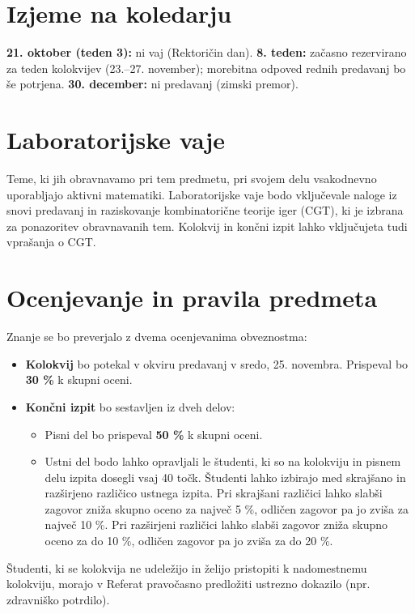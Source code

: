 \documentclass[11pt, a4paper]{article}
\begin{document}
\section*{Izjeme na koledarju}

\textbf{21. oktober (teden 3):} ni vaj (Rektoričin dan). \textbf{8. teden:} začasno rezervirano za teden kolokvijev (23.–27. november); morebitna odpoved rednih predavanj bo še potrjena. \textbf{30. december:} ni predavanj (zimski premor). 

\section*{Laboratorijske vaje}

Teme, ki jih obravnavamo pri tem predmetu, pri svojem delu vsakodnevno uporabljajo aktivni matematiki. Laboratorijske vaje bodo vključevale naloge iz snovi predavanj in raziskovanje kombinatorične teorije iger (CGT), ki je izbrana za ponazoritev obravnavanih tem. Kolokvij in končni izpit lahko vključujeta tudi vprašanja o CGT.

\section*{Ocenjevanje in pravila predmeta}

Znanje se bo preverjalo z dvema ocenjevanima obveznostma:
\begin{itemize}[label={\color{primary}\textbullet}]
    \item \textbf{Kolokvij} bo potekal v okviru predavanj v sredo, 25. novembra. Prispeval bo \textbf{30 \%} k skupni oceni.
    \item \textbf{Končni izpit} bo sestavljen iz dveh delov:
    \begin{itemize}[label={--}]
        \item Pisni del bo prispeval \textbf{50 \%} k skupni oceni.
        \item Ustni del bodo lahko opravljali le študenti, ki so na kolokviju in pisnem delu izpita dosegli vsaj 40 točk. Študenti lahko izbirajo med skrajšano in razširjeno različico ustnega izpita. Pri skrajšani različici lahko slabši zagovor zniža skupno oceno za največ 5 \%, odličen zagovor pa jo zviša za največ 10 \%. Pri razširjeni različici lahko slabši zagovor zniža skupno oceno za do 10 \%, odličen zagovor pa jo zviša za do 20 \%.
    \end{itemize}
\end{itemize}

Študenti, ki se kolokvija ne udeležijo in želijo pristopiti k nadomestnemu kolokviju, morajo v Referat pravočasno predložiti ustrezno dokazilo (npr. zdravniško potrdilo).
\end{document}
